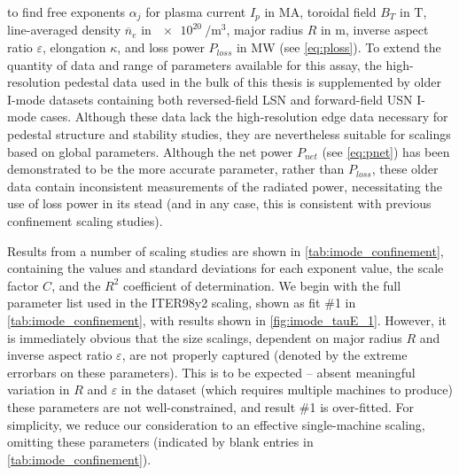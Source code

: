 \noindent to find free exponents $\alpha_j$ for plasma current $I_p$ in $\si{\mega\ampere}$, toroidal field $B_T$ in $\si{\tesla}$, line-averaged density $\overline{n}_e$ in $\SI{e20}{\per\meter\cubed}$, major radius $R$ in $\si{\meter}$, inverse aspect ratio $\varepsilon$, elongation $\kappa$, and loss power $P_{loss}$ in $\si{\mega\watt}$ (see \cref{eq:ploss}).  To extend the quantity of data and range of parameters available for this assay, the high-resolution pedestal data used in the bulk of this thesis is supplemented by older I-mode datasets containing both reversed-field LSN and forward-field USN I-mode cases.  Although these data lack the high-resolution edge data necessary for pedestal structure and stability studies, they are nevertheless suitable for scalings based on global parameters.  Although the net power $P_{net}$ (see \cref{eq:pnet}) has been demonstrated to be the more accurate parameter, rather than $P_{loss}$, these older data contain inconsistent measurements of the radiated power, necessitating the use of loss power in its stead (and in any case, this is consistent with previous confinement scaling studies).

Results from a number of scaling studies are shown in \cref{tab:imode_confinement}, containing the values and standard deviations for each exponent value, the scale factor $C$, and the $R^2$ coefficient of determination.  We begin with the full parameter list used in the ITER98y2 scaling, shown as fit \#1 in \cref{tab:imode_confinement}, with results shown in \cref{fig:imode_tauE_1}.  However, it is immediately obvious that the size scalings, dependent on major radius $R$ and inverse aspect ratio $\varepsilon$, are not properly captured (denoted by the extreme errorbars on these parameters).  This is to be expected -- absent meaningful variation in $R$ and $\varepsilon$ in the dataset (which requires multiple machines to produce) these parameters are not well-constrained, and result \#1 is over-fitted.  For simplicity, we reduce our consideration to an effective single-machine scaling, omitting these parameters (indicated by blank entries in \cref{tab:imode_confinement}).  

